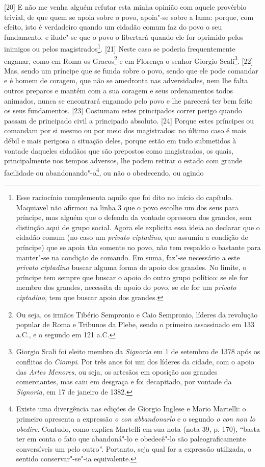 {[}20{]} E não me venha alguém refutar esta minha opinião com aquele
provérbio trivial, de que quem se apoia sobre o povo, apoia"-se sobre a
lama: porque, com efeito, isto é verdadeiro quando um cidadão comum faz
do povo o seu fundamento, e ilude"-se que o povo o libertará quando ele
for oprimido pelos inimigos ou pelos magistrados\footnote{Esse
  raciocínio complementa aquilo que foi dito no início do capítulo.
  Maquiavel não afirmou na linha 3 que o povo escolhe um dos seus para
  príncipe, mas alguém que o defenda da vontade opressora dos grandes,
  sem distinção aqui de grupo social. Agora ele explicita essa ideia ao
  declarar que o cidadão comum (no caso um \emph{privato ciptadino}, que
  assumiu a condição de príncipe) que se apoia tão somente no povo, não
  tem respaldo o bastante para manter"-se na condição de comando. Em
  suma, faz"-se necessário a este \emph{privato ciptadino} buscar alguma
  forma de apoio dos grandes. No limite, o príncipe tem sempre que
  buscar o apoio do outro grupo político: se ele for membro dos grandes,
  necessita de apoio do povo, se ele for um \emph{privato ciptadino},
  tem que buscar apoio dos grandes.}. {[}21{]} Neste caso se poderia
frequentemente enganar, como em Roma os Gracos\footnote{Ou seja, os
  irmãos Tibério Sempronio e Caio Sempronio, líderes da revolução
  popular de Roma e Tribunos da Plebe, sendo o primeiro assassinado em
  133 a.C., e o segundo em 121 a.C.} e em Florença o senhor Giorgio
Scali\footnote{Giorgio Scali foi eleito membro da \emph{Signoria} em 1
  de setembro de 1378 após os conflitos do \emph{Ciompi}. Por três anos
  foi um dos líderes da cidade, com o apoio das \emph{Artes Menores}, ou
  seja, os artesãos em oposição aos grandes comerciantes, mas caiu em
  desgraça e foi decapitado, por vontade da \emph{Signoria}, em 17 de
  janeiro de 1382.}. {[}22{]} Mas, sendo um príncipe que se funda sobre
o povo, sendo que ele pode comandar e é homem de coragem, que não se
amedronta nas adversidades, nem lhe falta outros preparos e mantém com a
sua coragem e seus ordenamentos todos animados, nunca se encontrará
enganado pelo povo e lhe parecerá ter bem feito os seus fundamentos.
{[}23{]} Costumam estes principados correr perigo quando passam de
principado civil a principado absoluto. {[}24{]} Porque estes príncipes
ou comandam por si mesmo ou por meio dos magistrados: no último caso é
mais débil e mais perigosa a situação deles, porque estão em tudo
submetidos à vontade daqueles cidadãos que são prepostos como
magistrados, os quais, principalmente nos tempos adversos, lhe podem
retirar o estado com grande facilidade ou abandonando"-o\footnote{Existe
  uma divergência nas edições de Giorgio Inglese e Mario Martelli: o
  primeiro apresenta a expressão \emph{o con abbandonarlo} e o segundo
  \emph{o con non lo obedire}. Contudo, como explica Martelli em sua
  nota (nota 39, p. 170), ``basta ter em conta o fato que abandoná"-lo e
  obedecê"-lo são paleograficamente conversíveis um pelo outro''.
  Portanto, seja qual for a expressão utilizada, o sentido
  conservar"-se"-ia equivalente.}, ou não o obedecendo, ou agindo
